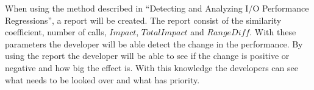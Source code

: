 \documentclass[oneside]{book}
\begin{document}
\newline
When using the method described in ``Detecting and Analyzing I/O Performance Regressions'', a report will be created. The report consist of the similarity coefficient, number of calls, $Impact$, $TotalImpact$ and $RangeDiff$. With these parameters the developer will be able detect the change in the performance. By using the report the developer will be able to see if the change is positive or negative and how big the effect is. With this knowledge the developers can see what needs to be looked over and what has priority.



\newpage
% 

\appendix



\backmatter

{}



\end{document}
